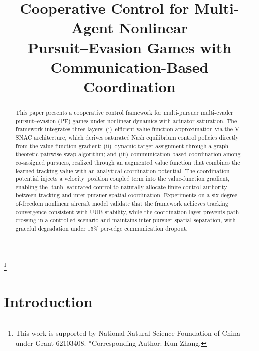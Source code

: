 \documentclass[conference]{IEEEtran}
\newcommand\blfootnote[1]{%
  \begingroup
  \renewcommand\thefootnote{}\footnote{#1}%
  \addtocounter{footnote}{-1}%
  \endgroup
}
\begin{document}
\title{Cooperative Control for Multi-Agent Nonlinear\\Pursuit--Evasion Games with Communication-Based Coordination}

\author{
}

\maketitle

\begin{abstract}
This paper presents a cooperative control framework for multi-pursuer multi-evader pursuit--evasion (PE) games under nonlinear dynamics with actuator saturation. The framework integrates three layers: (i)~efficient value-function approximation via the V-SNAC architecture, which derives saturated Nash equilibrium control policies directly from the value-function gradient; (ii)~dynamic target assignment through a graph-theoretic pairwise swap algorithm; and (iii)~communication-based coordination among co-assigned pursuers, realized through an augmented value function that combines the learned tracking value with an analytical coordination potential. The coordination potential injects a velocity--position coupled term into the value-function gradient, enabling the $\tanh$-saturated control to naturally allocate finite control authority between tracking and inter-pursuer spatial coordination. Experiments on a six-degree-of-freedom nonlinear aircraft model validate that the framework achieves tracking convergence consistent with UUB stability, while the coordination layer prevents path crossing in a controlled scenario and maintains inter-pursuer spatial separation, with graceful degradation under 15\% per-edge communication dropout.
\end{abstract}

\blfootnote{
This work is supported by National Natural Science Foundation of China under Grant 62103408.
*Corresponding Author: Kun Zhang.
}

\section{Introduction}
\end{document}
